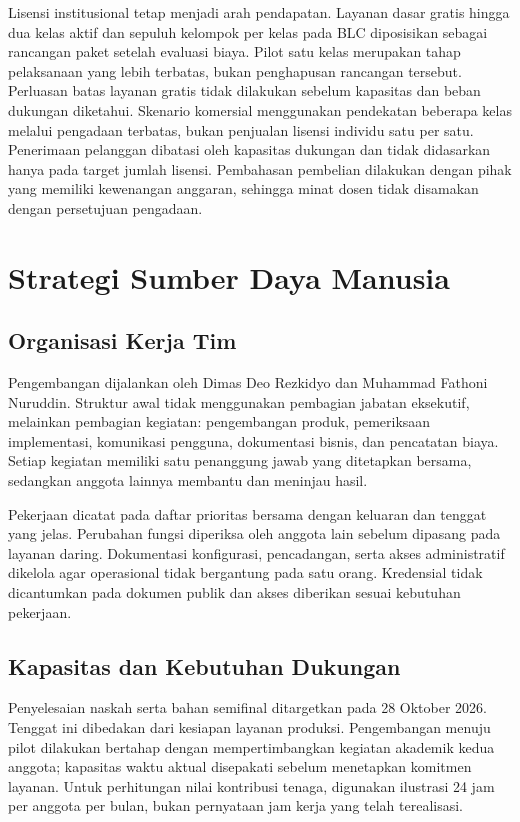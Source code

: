 \documentclass[12pt,a4paper,oneside]{report}
\begin{document}
Lisensi institusional tetap menjadi arah pendapatan. Layanan dasar gratis hingga dua kelas aktif dan sepuluh kelompok per kelas pada BLC diposisikan sebagai rancangan paket setelah evaluasi biaya. Pilot satu kelas merupakan tahap pelaksanaan yang lebih terbatas, bukan penghapusan rancangan tersebut. Perluasan batas layanan gratis tidak dilakukan sebelum kapasitas dan beban dukungan diketahui. Skenario komersial menggunakan pendekatan beberapa kelas melalui pengadaan terbatas, bukan penjualan lisensi individu satu per satu. Penerimaan pelanggan dibatasi oleh kapasitas dukungan dan tidak didasarkan hanya pada target jumlah lisensi. Pembahasan pembelian dilakukan dengan pihak yang memiliki kewenangan anggaran, sehingga minat dosen tidak disamakan dengan persetujuan pengadaan.

\section{Strategi Sumber Daya Manusia}
\subsection{Organisasi Kerja Tim}
Pengembangan dijalankan oleh Dimas Deo Rezkidyo dan Muhammad Fathoni Nuruddin. Struktur awal tidak menggunakan pembagian jabatan eksekutif, melainkan pembagian kegiatan: pengembangan produk, pemeriksaan implementasi, komunikasi pengguna, dokumentasi bisnis, dan pencatatan biaya. Setiap kegiatan memiliki satu penanggung jawab yang ditetapkan bersama, sedangkan anggota lainnya membantu dan meninjau hasil.

Pekerjaan dicatat pada daftar prioritas bersama dengan keluaran dan tenggat yang jelas. Perubahan fungsi diperiksa oleh anggota lain sebelum dipasang pada layanan daring. Dokumentasi konfigurasi, pencadangan, serta akses administratif dikelola agar operasional tidak bergantung pada satu orang. Kredensial tidak dicantumkan pada dokumen publik dan akses diberikan sesuai kebutuhan pekerjaan.

\subsection{Kapasitas dan Kebutuhan Dukungan}
Penyelesaian naskah serta bahan semifinal ditargetkan pada 28 Oktober 2026. Tenggat ini dibedakan dari kesiapan layanan produksi. Pengembangan menuju pilot dilakukan bertahap dengan mempertimbangkan kegiatan akademik kedua anggota; kapasitas waktu aktual disepakati sebelum menetapkan komitmen layanan. Untuk perhitungan nilai kontribusi tenaga, digunakan ilustrasi 24 jam per anggota per bulan, bukan pernyataan jam kerja yang telah terealisasi.
\end{document}
